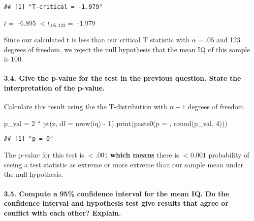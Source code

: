 \documentclass[
]{article}
\newenvironment{Shaded}{\begin{snugshade}}{\end{snugshade}}
\newcommand{\AttributeTok}[1]{\textcolor[rgb]{0.77,0.63,0.00}{#1}}
\newcommand{\DecValTok}[1]{\textcolor[rgb]{0.00,0.00,0.81}{#1}}
\newcommand{\FunctionTok}[1]{\textcolor[rgb]{0.00,0.00,0.00}{#1}}
\newcommand{\NormalTok}[1]{#1}
\newcommand{\OtherTok}[1]{\textcolor[rgb]{0.56,0.35,0.01}{#1}}
\newcommand{\SpecialCharTok}[1]{\textcolor[rgb]{0.00,0.00,0.00}{#1}}
\newcommand{\StringTok}[1]{\textcolor[rgb]{0.31,0.60,0.02}{#1}}
\begin{document}
\begin{verbatim}
## [1] "T-critical = -1.979"
\end{verbatim}

\(t=\) -6.895 \(< t_{.05, 123}=\) -1.979

Since our calculated t is less than our critical T statistic with
\(\alpha = .05\) and 123 degrees of freedom, we reject the null
hypothesis that the mean IQ of this sample is 100.

\hypertarget{give-the-p-value-for-the-test-in-the-previous-question.-state-the-interpretation-of-the-p-value.}{%
\paragraph{3.4. Give the p-value for the test in the previous question.
State the interpretation of the
p-value.}\label{give-the-p-value-for-the-test-in-the-previous-question.-state-the-interpretation-of-the-p-value.}}

Calculate this result using the the T-distribution with \(n-1\) degrees
of freedom.

\begin{Shaded}
\begin{Highlighting}[]
\NormalTok{p\_val }\OtherTok{=} \DecValTok{2} \SpecialCharTok{*} \FunctionTok{pt}\NormalTok{(z, }\AttributeTok{df =} \FunctionTok{nrow}\NormalTok{(iq) }\SpecialCharTok{{-}} \DecValTok{1}\NormalTok{)}
\FunctionTok{print}\NormalTok{(}\FunctionTok{paste0}\NormalTok{(}\StringTok{\textquotesingle{}p = \textquotesingle{}}\NormalTok{, }\FunctionTok{round}\NormalTok{(p\_val, }\DecValTok{4}\NormalTok{)))}
\end{Highlighting}
\end{Shaded}

\begin{verbatim}
## [1] "p = 0"
\end{verbatim}

The p-value for this test is \(< .001\) \textbf{which means} there is
\(< 0.001\) probability of seeing a test statistic as extreme or more
extreme than our sample mean under the null hypothesis.

\hypertarget{compute-a-95-confidence-interval-for-the-mean-iq.-do-the-confidence-interval-and-hypothesis-test-give-results-that-agree-or-conflict-with-each-other-explain.}{%
\paragraph{3.5. Compute a 95\% confidence interval for the mean IQ. Do
the confidence interval and hypothesis test give results that agree or
conflict with each other?
Explain.}\label{compute-a-95-confidence-interval-for-the-mean-iq.-do-the-confidence-interval-and-hypothesis-test-give-results-that-agree-or-conflict-with-each-other-explain.}}
\end{document}
